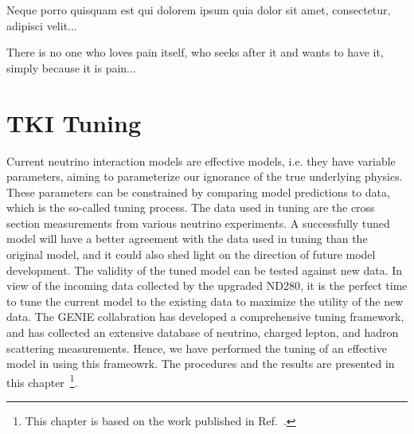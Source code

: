 \begin{savequote}[8cm]
\textlatin{Neque porro quisquam est qui dolorem ipsum quia dolor sit amet, consectetur, adipisci velit...}

There is no one who loves pain itself, who seeks after it and wants to have it, simply because it is pain...
\end{savequote}

\chapter{\label{ch:tuning}TKI Tuning}

\minitoc

Current neutrino interaction models are effective models, i.e. they have variable parameters, aiming to parameterize our ignorance of the true underlying physics.
These parameters can be constrained by comparing model predictions to data, which is the so-called tuning process.
The data used in tuning are the cross section measurements from various neutrino experiments.
A successfully tuned model will have a better agreement with the data used in tuning than the original model, and it could also shed light on the direction of future model development.
The validity of the tuned model can be tested against new data.
In view of the incoming data collected by the upgraded ND280, it is the perfect time to tune the current model to the existing data to maximize the utility of the new data.
The GENIE collabration has developed a comprehensive tuning framework, and has collected an extensive database of neutrino, charged lepton, and hadron scattering measurements. 
Hence, we have performed the tuning of an effective model in \genie using this frameowrk.
The procedures and the results are presented in this chapter~\footnote{This chapter is based on the work published in Ref.~\cite{GENIE:2024ufm}.}.

